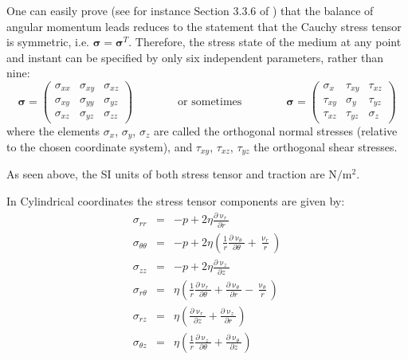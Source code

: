 One can easily prove (see for instance Section 3.3.6 of \cite{grbl09}) that the balance 
of angular momentum leads reduces to the statement that the Cauchy stress tensor 
is symmetric, i.e. ${\bm \sigma}={\bm \sigma}^T$.
Therefore, the stress state of the medium at any point and instant can be specified by only six independent parameters, rather than nine:
\begin{equation}
{\bm \sigma}=
\left(
\begin{array}{ccc}
\sigma_{xx} & \sigma_{xy} & \sigma_{xz} \\
\sigma_{xy} & \sigma_{yy} & \sigma_{yz} \\
\sigma_{xz} & \sigma_{yz} & \sigma_{zz} 
\end{array}
\right)
\qquad\qquad
\text{or sometimes}
\qquad\qquad
{\bm \sigma}=
\left(
\begin{array}{ccc}
\sigma_{x}  & \tau_{xy}  & \tau_{xz} \\
\tau_{xy}   & \sigma_{y} & \tau_{yz} \\
\tau_{xz}   & \tau_{yz}  & \sigma_{z} 
\end{array}
\right)
\end{equation}
where the elements $\sigma _{x}$, $\sigma _{y}$, $\sigma _{z}$ are called the orthogonal 
normal stresses (relative to the chosen coordinate system), and $\tau _{xy}$, $\tau _{xz}$,
$\tau _{yz}$ the orthogonal shear stresses.

As seen above, the SI units of both stress tensor and traction are $\text{N}/\text{m}^2$.

In Cylindrical coordinates the stress tensor components are given by:
\begin{eqnarray}
\sigma_{rr} &=& -p + 2 \eta \frac{\partial \upnu_r}{\partial r}      \\
\sigma_{\theta\theta} &=& 
 -p + 2\eta \left( \frac{1}{r} \frac{\partial \upnu_\theta}{\partial\theta} +\frac{\upnu_r}{r} \right)    \\
\sigma_{zz} &=& -p + 2 \eta \frac{\partial \upnu_z}{\partial z}      \\
\sigma_{r\theta} &=& \eta \left( \frac{1}{r} \frac{\partial \upnu_r}{\partial \theta} 
+ \frac{\partial \upnu_\theta}{\partial r} - \frac{\upnu_\theta}{r} \right)  \\
\sigma_{rz} &=& \eta \left( \frac{\partial \upnu_r}{\partial z}  + \frac{\partial \upnu_z}{\partial r}\right) \\
\sigma_{\theta z} &=&  \eta \left(  \frac{1}{r} \frac{\partial \upnu_z}{\partial \theta}
+\frac{\partial \upnu_\theta}{\partial z}     \right) 
\end{eqnarray}

